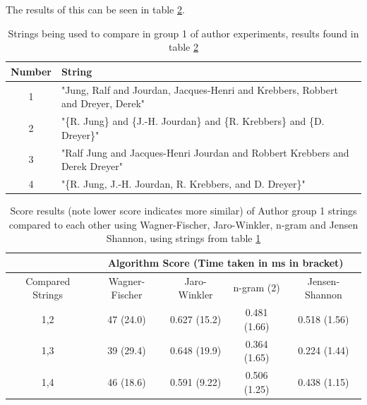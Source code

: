 \documentclass[a4paper,11pt]{article}
\begin{document}
The results of this can be seen in table \ref{table:algComparisonResults}.


  \begin{table}[H]
      \centering
      \begin{tabular}{|c|p{}|}
      \hline
           Number &  String \\ \hline \hline
           1 & "Jung, Ralf and Jourdan, Jacques-Henri and Krebbers, Robbert and Dreyer, Derek" \\ \hline
           2 & "\{R. Jung\} and \{J.-H. Jourdan\} and \{R. Krebbers\} and \{D. Dreyer\}" \\ \hline
           3 & "Ralf Jung and Jacques-Henri Jourdan and Robbert Krebbers and Derek Dreyer" \\ \hline
           4 & "\{R. Jung, J.-H. Jourdan, R. Krebbers, and D. Dreyer\}" \\
           \hline
      \end{tabular}
      \caption{Strings being used to compare in group 1 of author experiments, results found in table \ref{table:algComparisonResults}}
\label{table:authorsGroup1Strings}
  \end{table}
    \begin{table}[H]
    \centering
       \begin{tabular}{|c|c|c|c|c|}
    \hline
     & \multicolumn{4}{c|}{Algorithm Score (Time taken in ms in bracket)}\\
     \hline
     Compared Strings  & Wagner-Fischer & Jaro-Winkler & n-gram (2) & Jensen-Shannon \\
     \hline \hline
    1,2 &      47 (24.0) & 0.627 (15.2)
    &   0.481 (1.66)
             &        0.518 (1.56)      \\
             \hline
    1,3 & 39 (29.4) & 0.648 (19.9) & 0.364 (1.65) & 0.224 (1.44) \\
    \hline
    1,4 & 46 (18.6) & 0.591 (9.22) & 0.506 (1.25) & 0.438 (1.15) \\
    \hline
    \end{tabular}
    \caption{Score results (note lower score indicates more similar) of Author group 1 strings compared to each other using Wagner-Fischer, Jaro-Winkler, n-gram and Jensen Shannon, using strings from table \ref{table:authorsGroup1Strings}}
\label{table:algComparisonResults}
\end{table}
\end{document}
